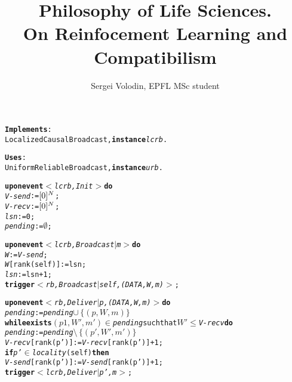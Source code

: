 \documentclass[a4paper]{article}
\title{Philosophy of Life Sciences.\\ On Reinfocement Learning and Compatibilism}
\author{Sergei Volodin, EPFL MSc student}
\date{}
\begin{document}
	
\maketitle

\begin{alltt}
\normalfont
\textbf{Implements}:
    LocalizedCausalBroadcast, \textbf{instance} \textit{lcrb}.

\textbf{Uses}:
    UniformReliableBroadcast, \textbf{instance} \textit{urb}.

\textbf{upon event} \textit{\(<\)lcrb, Init\(>\)} \textbf{do}
    \textit{V-send} := \([0]\sp{N}\);
    \textit{V-recv} := \([0]\sp{N}\);
    \textit{lsn} := 0;
    \textit{pending} := \(\emptyset\);

\textbf{upon event} \textit{\(<\)lcrb, Broadcast \(|\) \textit{m}\(>\)} \textbf{do}
    \textit{W} := \textit{V-send};
    \textit{W}[rank(self)] := lsn;
    \textit{lsn} := lsn + 1;
    \textbf{trigger} \textit{\(<\)rb, Broadcast \(|\) self, (DATA, W, m)\(>\)};

\textbf{upon event} \textit{\(<\)rb, Deliver \(|\) p, (DATA, W, m)\(>\)} \textbf{do}
    \textit{pending} := \textit{pending} \(\cup\,\{(p,W,m)\}\) 
    \textbf{while exists} \((p1,W',m')\) \(\in\) \textit{pending} such that \(W'\leq \)\textit{V-recv} \textbf{do}
        \textit{pending} := \textit{pending} \(\setminus\,\{(p',W',m')\}\)
        \textit{V-recv}[rank(p')] := \textit{V-recv}[rank(p')] + 1;
        \textbf{if} \textit{p'} \(\in\) \textit{locality}(self) \textbf{then}
            \textit{V-send}[rank(p')] := \textit{V-send}[rank(p')] + 1;
        \textbf{trigger} \textit{\(<\)lcrb, Deliver \(|\) p', m\(>\)};
\end{alltt}
\end{document}
